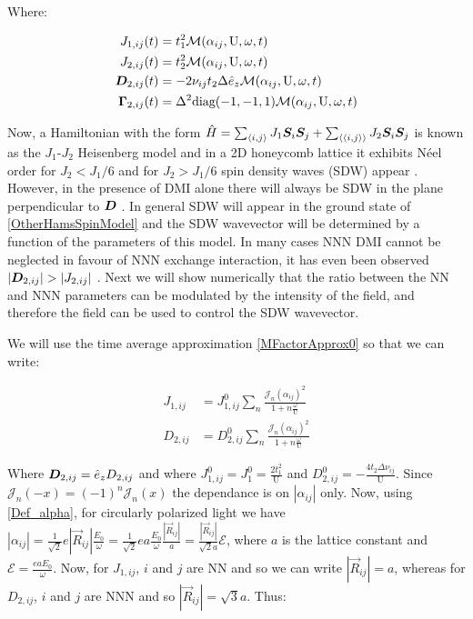 Where:

\begin{align*}
J_{1,ij}(t) &= t_1^2\mathcal{M}(\alpha_{ij}, \text{U}, \omega, t) \\
J_{2,ij}(t) &= t_2^2\mathcal{M}(\alpha_{ij}, \text{U}, \omega, t) \\
\boldsymbol{D}_{2,ij}(t) &= - 2\nu_{ij} t_2 \Delta \hat{e}_z \mathcal{M}(\alpha_{ij}, \text{U}, \omega, t) \\
\boldsymbol{\Gamma}_{2,ij}(t) &= \Delta^2 \text{diag}(-1,-1,1) \mathcal{M}(\alpha_{ij}, \text{U}, \omega, t) 
\end{align*}

Now, a Hamiltonian with the form $\hat{H} = \sum_{\langle i,j \rangle} J_1 \boldsymbol{S}_i\boldsymbol{S}_j + \sum_{\langle \langle i,j \rangle \rangle} J_2\boldsymbol{S}_i\boldsymbol{S}_j$ is known as the $J_1$-$J_2$ Heisenberg model and in a 2D honeycomb lattice it exhibits N\'eel order for $J_2 < J_1 / 6$ and for $J_2 > J_1 / 6$ spin density waves (SDW) appear \cite{Mulder2010}. However, in the presence of DMI alone there will always be SDW in the plane perpendicular to $\boldsymbol{D}$ \cite{Uchida2006}. In general SDW will appear in the ground state of \ref{OtherHamsSpinModel} and the SDW wavevector will be determined by a function of the parameters of this model. In many cases NNN DMI cannot be neglected in favour of NNN exchange interaction, it has even been observed $|\boldsymbol{D}_{2,ij}| > |J_{2,ij}|$ \cite{Chen2018}. Next we will show numerically that the ratio between the NN and NNN parameters can be modulated by the intensity of the field, and therefore the field can be used to control the SDW wavevector. 

We will use the time average approximation \ref{MFactorApprox0} so that we can write:

\begin{align}
J_{1,ij} &= J_{1,ij}^0  \sum_{n} \frac{\mathcal{J}_n(\alpha_{ij})^2}{1+n\frac{\omega}{\text{U}}} \\
D_{2,ij} &= D_{2,ij}^0  \sum_{n} \frac{\mathcal{J}_n(\alpha_{ij})^2}{1+n\frac{\omega}{\text{U}}}
\end{align}

Where $\boldsymbol{D}_{2,ij} = \hat{e}_z D_{2,ij}$ and where $J_{1,ij}^0 = J_{1}^0 = \frac{2t_1^2}{\text{U}}$ and $D_{2,ij}^0 = -\frac{4t_2\Delta\nu_{ij}}{\text{U}}$. Since $\mathcal{J}_n(-x) = (-1)^n\mathcal{J}_n(x)$ the dependance is on $|\alpha_{ij}|$ only. Now, using \ref{Def_alpha}, for circularly polarized light we have $|\alpha_{ij}| = \frac{1}{\sqrt{2}}e|\vec{R}_{ij}| \frac{E_0}{\omega} = \frac{1}{\sqrt{2}}ea \frac{E_0}{\omega} \frac{|\vec{R}_{ij}|}{a} = \frac{|\vec{R}_{ij}|}{\sqrt{2}a} \mathcal{E}$, where $a$ is the lattice constant and $\mathcal{E} = \frac{eaE_0}{\omega}$. Now, for $J_{1,ij}$, $i$ and $j$ are NN and so we can write $|\vec{R}_{ij}|=a$, whereas for $D_{2,ij}$, $i$ and $j$ are NNN and so $|\vec{R}_{ij}|=\sqrt{3}a$. Thus:

